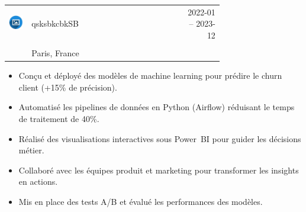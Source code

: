 \documentclass{article}
\begin{document}
\begin{paracol}{2}
\colorbox{maincolor}{%
  \begin{minipage}{\linewidth}
    \begin{tabular}{@{}lp{0.72\linewidth}r}
      \begin{minipage}{0.05\linewidth}
        \includegraphics[width=\linewidth]{picon.png}
      \end{minipage} & 
      qsksbkcbkSB &  
      {\footnotesize 2022-01 -- 2023-12 } \\[-10pt]
      & {\color{sidetext}{Data Scientist}} & \\
      & {\small Paris, France } & \\
    \end{tabular}
\begin{itemize}
    \item Conçu et déployé des modèles de machine learning pour prédire le churn client (+15\% de précision).
    \item Automatisé les pipelines de données en Python (Airflow) réduisant le temps de traitement de 40\%.
    \item Réalisé des visualisations interactives sous Power~BI pour guider les décisions métier.
    \item Collaboré avec les équipes produit et marketing pour transformer les insights en actions.
    \item Mis en place des tests A/B et évalué les performances des modèles.
\end{itemize}
  \end{minipage}%
}


\end{paracol}
\end{document}
